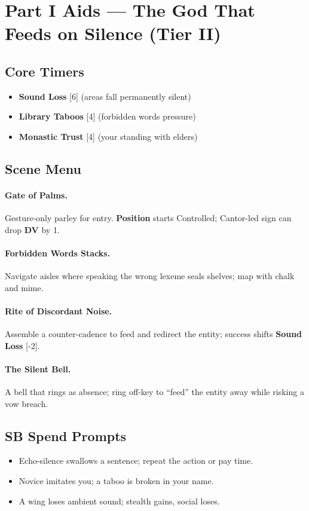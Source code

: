 \documentclass[11pt]{article}
\newcommand{\Clock}[2]{\textbf{#1} [#2]}
\newcommand{\Term}[1]{\textbf{#1}}
\newcommand{\DV}{\Term{DV}}
\newcommand{\Position}{\Term{Position}}
\newcommand{\SB}{\Term{SB}}
\begin{document}
\section{Part I Aids --- The God That Feeds on Silence (Tier II)}
\label{app:part1}
\subsection*{Core Timers}
\begin{itemize}
\item \Clock{Sound Loss}{6} (areas fall permanently silent)
\item \Clock{Library Taboos}{4} (forbidden words pressure)
\item \Clock{Monastic Trust}{4} (your standing with elders)
\end{itemize}

\subsection*{Scene Menu}
\paragraph{Gate of Palms.} Gesture-only parley for entry. \Position{} starts Controlled; Cantor-led sign can drop \DV{} by 1.
\paragraph{Forbidden Words Stacks.} Navigate aisles where speaking the wrong lexeme seals shelves; map with chalk and mime.
\paragraph{Rite of Discordant Noise.} Assemble a counter-cadence to feed and redirect the entity; success shifts \Clock{Sound Loss}{-2}.
\paragraph{The Silent Bell.} A bell that rings as absence; ring off-key to ``feed'' the entity away while risking a vow breach.

\subsection*{\SB{} Spend Prompts}
\begin{itemize}
\item Echo-silence swallows a sentence; repeat the action or pay time.
\item Novice imitates you; a taboo is broken in your name.
\item A wing loses ambient sound; stealth gains, social loses.
\end{itemize}
\end{document}
